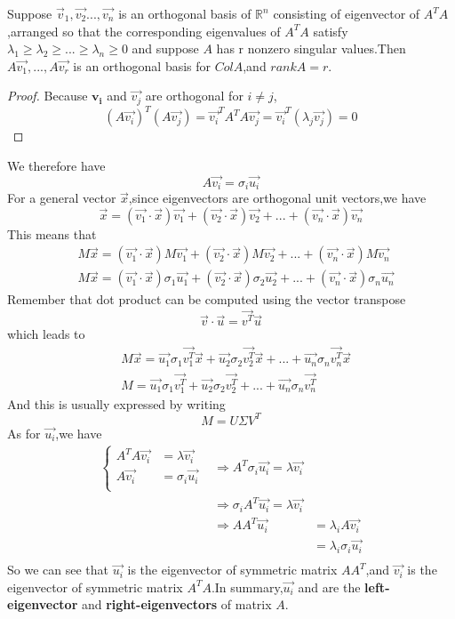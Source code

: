\begin{theorem}
	Suppose {$\vec{v}_1,\vec{v_2}...,\vec{v_n}$} is an orthogonal basis of $\mathbb{R}^n$ consisting of eigenvector of $A^TA$,arranged so that the corresponding eigenvalues of  $A^TA$ satisfy $\lambda_1 \geq \lambda_2 \geq...\geq \lambda_n \geq 0$  and suppose $A$ has r nonzero singular values.Then {$A\vec{v_1},...,A\vec{v_r}$} is an orthogonal basis for $ColA$,and $rankA=r$. 
\end{theorem}
\begin{proof}
	Because $\mathbf{v_i}$ and $\vec{v_j}$ are orthogonal for $i\neq j$,
	\begin{equation}
	(A\vec{v_i})^T(A\vec{v_j}) = \vec{v_i}^TA^TA\vec{v_j} = \vec{v_i}^T(\lambda_j\vec{v_j})=0
	\end{equation} 
\end{proof}
We therefore have
\begin{equation}
A\vec{v_i} = \sigma_i\vec{u_i}
\end{equation}
For a general vector $\vec{x}$,since eigenvectors are orthogonal unit vectors,we have
\begin{equation}
\vec{x} = (\vec{v_1}\cdot\vec{x})\vec{v_1} + (\vec{v_2}\cdot\vec{x})\vec{v_2} +...+(\vec{v_n}\cdot\vec{x})\vec{v_n}
\end{equation}
This means that
\begin{align}
& M\vec{x} = (\vec{v_1}\cdot\vec{x})M\vec{v_1} + (\vec{v_2}\cdot\vec{x})M\vec{v_2} +...+(\vec{v_n}\cdot\vec{x})M\vec{v_n} \\
& M\vec{x} = (\vec{v_1}\cdot\vec{x})\sigma_1\vec{u_1} + (\vec{v_2}\cdot\vec{x})\sigma_2\vec{u_2} +...+(\vec{v_n}\cdot\vec{x})\sigma_n\vec{u_n}
\end{align}
Remember that dot product can be computed using the vector transpose
\begin{equation}
\vec{v}\cdot\vec{u} = \vec{v^T}\vec{u}
\end{equation}
which leads to
\begin{align}
& M\vec{x} = \vec{u_1}\sigma_1\vec{v_1^T}\vec{x}+\vec{u_2}\sigma_2\vec{v_2^T}\vec{x}+...+\vec{u_n}\sigma_n\vec{v_n^T}\vec{x} \\
&  M = \vec{u_1}\sigma_1\vec{v_1^T}+\vec{u_2}\sigma_2\vec{v_2^T}+...+\vec{u_n}\sigma_n\vec{v_n^T}
\end{align}
And this is usually expressed by writing 
\begin{equation}
M = U\Sigma V^T
\end{equation}
As for $\vec{u_i}$,we have
\begin{align}
\begin{cases}
A^TA\vec{v_i} &= \lambda\vec{v_i} \\
A\vec{v_i}    &= \sigma_i\vec{u_i}     \\
\end{cases}
&\Rightarrow A^T\sigma_i\vec{u_i} = \lambda\vec{v_i} \\
&\Rightarrow \sigma_iA^T\vec{u_i} = \lambda\vec{v_i}\\
&\Rightarrow AA^T\vec{u_i}&=\lambda_iA\vec{v_i} \\
&						  &= \lambda_i\sigma_i\vec{u_i}\\
\end{align}
So we can see that $\vec{u_i}$ is the eigenvector of symmetric matrix $AA^T$,and $\vec{v_i}$ is the eigenvector of symmetric matrix $A^TA$.In summary,$\vec{u_i}$ and  are the \textbf{left-eigenvector} and \textbf{right-eigenvectors} of matrix $A$.